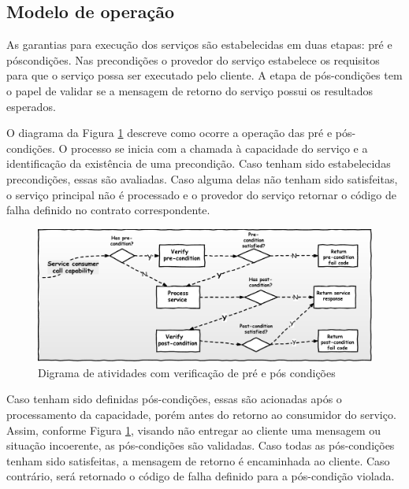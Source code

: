 \vspace{-6mm}

\subsection{Modelo de operação}
\vspace{-6mm}

As garantias para execução dos serviços são estabelecidas em duas etapas: pré e
póscondições. Nas precondições o provedor do serviço estabelece os requisitos
para que o serviço possa ser executado pelo cliente. A etapa de pós-condições
tem o papel de validar se a mensagem de retorno do serviço possui os resultados
esperados.

O diagrama da Figura \ref{FigServiceDbC} descreve como ocorre a operação das
pré e pós-condições. O processo se inicia com a chamada à capacidade do serviço e a
identificação da existência de uma precondição. Caso tenham sido estabelecidas 
precondições, essas são avaliadas. Caso alguma delas não tenham sido
satisfeitas, o serviço principal não é processado e o provedor do serviço
retornar o código de falha definido no contrato correspondente.


\begin{figure}[!htb]
\centering
\includegraphics[width=140mm,trim = 0mm 0mm 0mm
0mm,clip]{img/FluxoDbcCondicoes.pdf}
\caption{Digrama de atividades com verificação de pré e pós condições}
\label{FigServiceDbC}
\end{figure}

Caso tenham sido definidas pós-condições, essas são acionadas após o
processamento da capacidade, porém antes do retorno ao consumidor do serviço.
Assim, conforme Figura \ref{FigServiceDbC}, visando não entregar ao cliente uma
mensagem ou situação incoerente, as pós-condições são validadas. Caso todas as
pós-condições tenham sido satisfeitas, a mensagem de retorno é encaminhada ao
cliente. Caso contrário, será retornado o código de falha definido para a
pós-condição violada.

